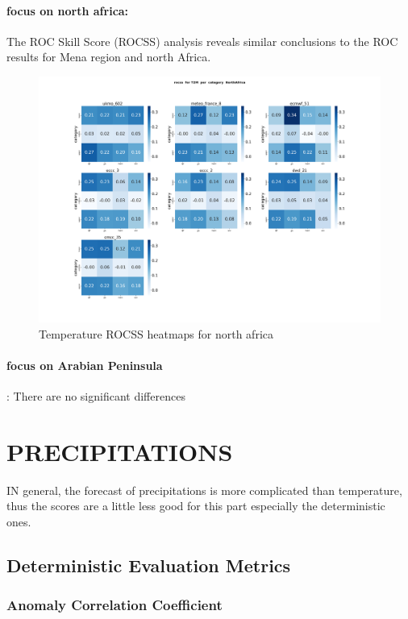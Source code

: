 \paragraph{focus on north africa:}
The ROC Skill Score (ROCSS) analysis reveals similar conclusions to the ROC results for Mena region and north Africa. 
\begin{figure}[H]
\includegraphics[scale=0.3]{plots/prob/rocss/rocss_T2M_category_NorthAfrica.png}

\caption{Temperature ROCSS  heatmaps for north africa }
\end{figure}

\paragraph{focus on Arabian Peninsula}:
There are no significant differences

\section{PRECIPITATIONS}
IN general, the forecast of precipitations is more complicated than temperature, thus the scores are a little less good for this part especially the deterministic ones. 
\subsection{Deterministic Evaluation Metrics}

\subsubsection{Anomaly Correlation Coefficient}

